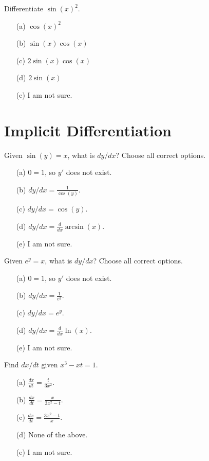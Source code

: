 \documentclass[14pt]{beamer}
\begin{document}
\begin{frame}
  Differentiate \(\sin(x)^{2}\).

  \medskip
  \begin{itemize} \setlength\itemsep{2ex}
    \item[(a)] \(\cos(x)^{2}\)
    \item[(b)] \(\sin(x)\cos(x)\)
    \item[(c)] \(2\sin(x)\cos(x)\)
    \item[(d)] \(2\sin(x)\)
    \item[(e)] I am not sure.
  \end{itemize} 
\end{frame}


\section{Implicit Differentiation}
\begin{frame}
  Given \(\sin(y) = x\), what is \(dy/dx\)? Choose all correct options.

  \medskip
  \begin{itemize} \setlength\itemsep{2ex}
    \item[(a)] \(0 = 1\), so \(y'\) does not exist.
    \item[(b)] \(dy/dx = \tfrac{1}{\cos(y)}\).
    \item[(c)] \(dy/dx = \cos(y)\).
    \item[(d)] \(dy/dx = \tfrac{d}{dx} \arcsin(x)\).
    \item[(e)] I am not sure.
  \end{itemize} 
\end{frame}


\begin{frame}
  Given \(e^{y} = x\), what is \(dy/dx\)? Choose all correct options.

  \medskip
  \begin{itemize} \setlength\itemsep{2ex}
    \item[(a)] \(0 = 1\), so \(y'\) does not exist.
    \item[(b)] \(dy/dx = \tfrac{1}{e^{y}}\).
    \item[(c)] \(dy/dx = e^{y}\).
    \item[(d)] \(dy/dx = \tfrac{d}{dx} \ln(x)\).
    \item[(e)] I am not sure.
  \end{itemize} 
\end{frame}


\begin{frame}
  Find \(dx/dt\) given \(x^{3} - xt = 1\).

  \medskip
  \begin{itemize} \setlength\itemsep{2ex}
    \item[(a)] \(\frac{dx}{dt} = \frac{t}{3x^{2}}\).
    \item[(b)] \(\frac{dx}{dt} = \frac{x}{3x^{2} - t}\).
    \item[(c)] \(\frac{dx}{dt} = \frac{3x^{2} - t}{x}\).
    \item[(d)] None of the above.
    \item[(e)] I am not sure.
  \end{itemize} 
\end{frame}
\end{document}
